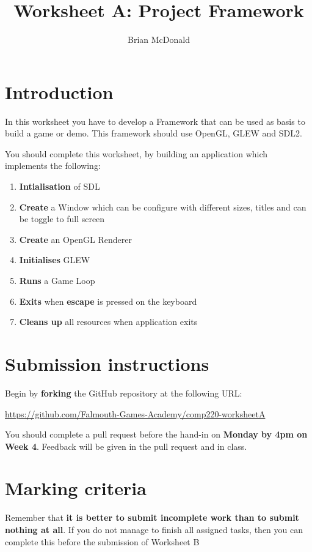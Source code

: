 \documentclass{../../../fal_assignment}
\title{Worksheet A: Project Framework}
\author{Brian McDonald}
\begin{document}
\maketitle

\section*{Introduction}

In this worksheet you have to develop a Framework that can be used as basis to build a game or demo. This framework should use OpenGL, GLEW and SDL2.

You should complete this worksheet, by building an application which implements the following:
\begin{enumerate}[label=(\alph*)]
	\item \textbf{Intialisation} of SDL
	\item \textbf{Create} a Window which can be configure with different sizes, titles and can be toggle to full screen
	\item \textbf{Create} an OpenGL Renderer
	\item \textbf{Initialises} GLEW
	\item \textbf{Runs} a Game Loop
	\item \textbf{Exits} when \textbf{escape} is pressed on the keyboard 
	\item \textbf{Cleans up} all resources when application exits
\end{enumerate}

\section*{Submission instructions}

Begin by \textbf{forking} the GitHub repository at the following URL:

\url{https://github.com/Falmouth-Games-Academy/comp220-worksheetA}

You should complete a pull request before the hand-in on \textbf{Monday by 4pm on Week 4}. Feedback will be given in the pull request and in class.

\section*{Marking criteria}

Remember that \textbf{it is better to submit incomplete work than to submit nothing at all}. If you do not manage to finish all assigned tasks, then you can complete this before the submission of Worksheet B
\end{document}
